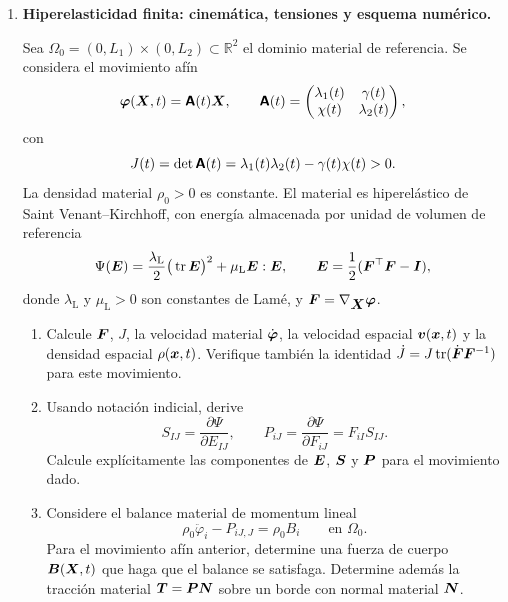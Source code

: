 \documentclass[11pt]{article}
\newcommand{\R}{\mathbb{R}}
\def\vec   #1{\mbox{\boldmath $#1$}{}}
\def\ten   #1{\mbox{\boldmath $#1$}{}}
\def\mat   #1{\mbox{\boldmath $\mathsf #1$}}
\DeclareMathOperator{\tr}{tr}
\begin{document}
\begin{enumerate}[label=\textbf{\arabic*.}, leftmargin=*]

\item \textbf{Hiperelasticidad finita: cinem\'atica, tensiones y esquema num\'erico.}

Sea $\Omega_0=(0,L_1)\times(0,L_2)\subset\R^2$ el dominio material de referencia. Se considera el movimiento af\'in
\begin{equation*}
    \vec\varphi(\vec X,t)=\mat A(t)\vec X,
    \qquad
    \mat A(t)=
    \begin{pmatrix}
        \lambda_1(t) & \gamma(t)\\
        \chi(t) & \lambda_2(t)
    \end{pmatrix},
\end{equation*}
con
\begin{equation*}
    J(t)=\det\mat A(t)=\lambda_1(t)\lambda_2(t)-\gamma(t)\chi(t)>0.
\end{equation*}
La densidad material $\rho_0>0$ es constante. El material es hiperel\'astico de Saint Venant--Kirchhoff, con energ\'ia almacenada por unidad de volumen de referencia
\begin{equation*}
    \Psi(\ten E)=\frac{\lambda_{\mathrm L}}{2}\big(\tr\ten E\big)^2+
    \mu_{\mathrm L}\ten E:\ten E,
    \qquad
    \ten E=\frac12(\ten F^\top\ten F-\ten I),
\end{equation*}
donde $\lambda_{\mathrm L}$ y $\mu_{\mathrm L}>0$ son constantes de Lam\'e, y $\ten F=\nabla_{\vec X}\vec\varphi$.

\begin{enumerate}[label=(\alph*), leftmargin=*]
    \item Calcule $\ten F$, $J$, la velocidad material $\dot{\vec\varphi}$, la velocidad espacial $\vec v(\vec x,t)$ y la densidad espacial $\rho(\vec x,t)$. Verifique tambi\'en la identidad $\dot J=J\tr(\dot{\ten F}\ten F^{-1})$ para este movimiento.

    \item Usando notaci\'on indicial, derive
    \begin{equation*}
        S_{IJ}=\frac{\partial \Psi}{\partial E_{IJ}},
        \qquad
        P_{iJ}=\frac{\partial \Psi}{\partial F_{iJ}}=F_{iI}S_{IJ}.
    \end{equation*}
    Calcule expl\'icitamente las componentes de $\ten E$, $\ten S$ y $\ten P$ para el movimiento dado.

    \item Considere el balance material de momentum lineal
    \begin{equation*}
        \rho_0\ddot\varphi_i-P_{iJ,J}=\rho_0B_i
        \qquad\text{en }\Omega_0.
    \end{equation*}
    Para el movimiento af\'in anterior, determine una fuerza de cuerpo $\vec B(\vec X,t)$ que haga que el balance se satisfaga. Determine adem\'as la tracci\'on material $\vec T=\ten P\vec N$ sobre un borde con normal material $\vec N$.


\end{enumerate}
\end{enumerate}
\end{document}

